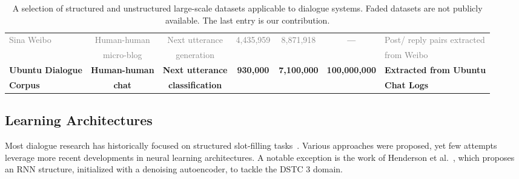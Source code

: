 \documentclass[11pt,a4paper]{article}
\begin{document}
\begin{table*}[t]
\begin{tabular}{|l ||c|c|c|c|c|l|}
\textcolor{gray}{Sina Weibo} \cite{shang2015neural} & \textcolor{gray}{Human-human} & \textcolor{gray}{Next utterance} & \textcolor{gray}{4,435,959} & \textcolor{gray}{8,871,918} & --- & \textcolor{gray}{Post/ reply pairs extracted} \\ 
& \textcolor{gray}{micro-blog} & \textcolor{gray}{generation}& & & & \textcolor{gray}{from Weibo} \\ \hline 







\textbf{Ubuntu Dialogue} & \textbf{Human-human} & \textbf{Next utterance} & \textbf{930,000} & \textbf{7,100,000} & \textbf{100,000,000} &\textbf{Extracted from Ubuntu} \\ 
\textbf{Corpus}& \textbf{chat} & \textbf{classification} & & & & \textbf{Chat Logs} \\ \hline
\end{tabular}
\caption{A selection of structured and unstructured large-scale datasets applicable to dialogue systems. Faded datasets are not publicly available. The last entry is our contribution.} 
\label{table:datasets}
\end{table*}


\subsection{Learning Architectures}

Most dialogue research has historically focused on structured slot-filling tasks~\cite{schatzmann2005quantitative}.  Various approaches were proposed, yet few attempts leverage more recent developments in neural learning architectures.  A notable exception is the work of Henderson et al.~\cite{henderson2014word}, which proposes an RNN structure, initialized with a denoising autoencoder, to tackle the DSTC 3 domain.
\end{document}
